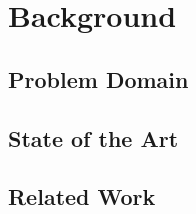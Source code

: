 
\chapter{Background}
\label{ch:background}

\section{Problem Domain}
\label{sec:background:problem+domain}

\kant[12-14]

\section{State of the Art}
\label{sec:background:state+of+the+art}

\kant[15-17]

\section{Related Work}
\label{sec:background:related+work}

\kant[18-20]

